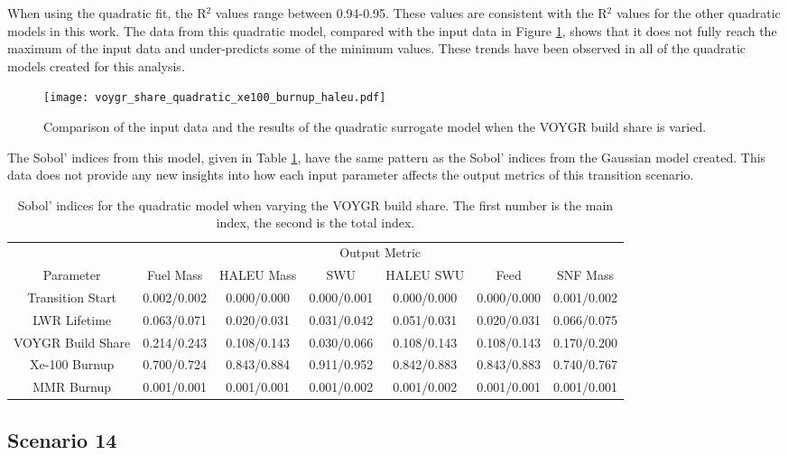 When using the quadratic fit, the R$^2$ values range between 0.94-0.95. 
These values are consistent with the R$^2$ values for the other 
quadratic models in this work. The data from this quadratic model,
compared with the input data in Figure \ref{fig:s7_voygr_quadratic}, 
shows that it does not fully reach the maximum of the input data
and under-predicts some of the minimum values. These trends have 
been observed in all of the quadratic models created for this analysis. 

\begin{figure}
    \centering 
    \texttt{[image: voygr\_share\_quadratic\_xe100\_burnup\_haleu.pdf]}
    \caption{Comparison of the input data and the results of the quadratic 
    surrogate model when the VOYGR build share is varied.}
    \label{fig:s7_voygr_quadratic}
\end{figure}

The Sobol' indices from this model, given in Table \ref{tab:s7_sobol_voygr_quadratic},
have the same pattern as the Sobol' indices from the Gaussian model created. 
This data does not provide any new insights into how each input parameter
affects the output metrics of this transition scenario. 

\begin{table}
    \centering
    \caption{Sobol' indices for the quadratic model when varying the VOYGR 
    build share. The first number is the main index, the second is the total 
    index.}
    \label{tab:s7_sobol_voygr_quadratic}
    \begin{tabular}{c c c c c c c}
        \hline
        & \multicolumn{6}{c}{Output Metric} \\
        Parameter & Fuel Mass & HALEU Mass & SWU & HALEU SWU & Feed & SNF Mass \\
        \hline
        Transition Start & 0.002/0.002 & 0.000/0.000 & 0.000/0.001 &
                           0.000/0.000 & 0.000/0.000 & 0.001/0.002\\
        LWR Lifetime & 0.063/0.071 & 0.020/0.031 & 0.031/0.042 &
                       0.051/0.031 & 0.020/0.031 & 0.066/0.075\\
        VOYGR Build Share & 0.214/0.243 & 0.108/0.143 & 0.030/0.066 &
                            0.108/0.143 & 0.108/0.143 & 0.170/0.200\\
        Xe-100 Burnup & \cellcolor{green!25}0.700/0.724 & \cellcolor{green!25}0.843/0.884 & \cellcolor{green!25}0.911/0.952 &
        \cellcolor{green!25}0.842/0.883 &\cellcolor{green!25} 0.843/0.883 & \cellcolor{green!25}0.740/0.767\\
        MMR Burnup & 0.001/0.001 & 0.001/0.001 & 0.001/0.002 &
                     0.001/0.002 & 0.001/0.001 & 0.001/0.001\\
        \hline        
    \end{tabular}
\end{table}


\subsection{Scenario 14}


